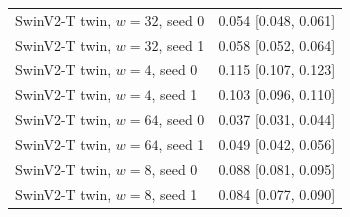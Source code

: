 \begin{tabular}{lc}
SwinV2-T twin, $w=32$, seed 0 & 0.054 [0.048, 0.061] \\
SwinV2-T twin, $w=32$, seed 1 & 0.058 [0.052, 0.064] \\
SwinV2-T twin, $w=4$, seed 0 & 0.115 [0.107, 0.123] \\
SwinV2-T twin, $w=4$, seed 1 & 0.103 [0.096, 0.110] \\
SwinV2-T twin, $w=64$, seed 0 & 0.037 [0.031, 0.044] \\
SwinV2-T twin, $w=64$, seed 1 & 0.049 [0.042, 0.056] \\
SwinV2-T twin, $w=8$, seed 0 & 0.088 [0.081, 0.095] \\
SwinV2-T twin, $w=8$, seed 1 & 0.084 [0.077, 0.090] \\
\bottomrule
\end{tabular}

